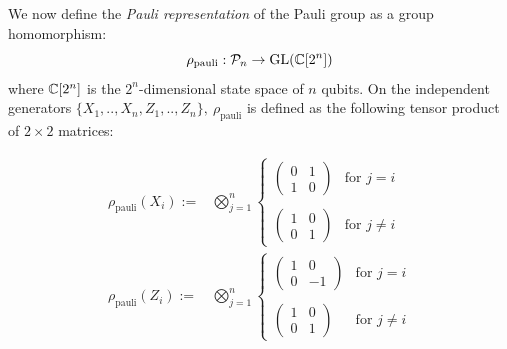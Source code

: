We now define the
{\it Pauli representation} 
of the Pauli group as a group homomorphism:
$$
    \rho_{\mathrm{pauli}} : \mathcal{P}_n \to \mathrm{GL}(\mathbb{C}[2^n])
$$
where $\mathbb{C}[2^n]$ is the $2^n$-dimensional state space of $n$ qubits.
On the independent generators 
$\{X_1, .., X_n, Z_1, .., Z_n\},\ \rho_{\mathrm{pauli}}$
is defined as the following tensor product of $2\times 2$ matrices:


\begin{align*}
\rho_{\mathrm{pauli}}(X_i) := &\bigotimes_{j=1}^n \left\{ \begin{array}{ll}
\left( \begin{array}{ll}
0&1\\
1&0\end{array} \right) &\mbox{for $j=i$}\\
\\
\left( \begin{array}{ll}
1&0\\
0&1\end{array} \right) &\mbox{for $j\ne i$} \end{array}
\right.\\
\rho_{\mathrm{pauli}}(Z_i) := &\bigotimes_{j=1}^n \left\{ \begin{array}{ll}
\left( \begin{array}{ll}
1&0\\
0&-1\end{array} \right) &\mbox{for $j=i$}\\
\\
\left( \begin{array}{rr}
1&0\\
0&1\end{array} \right) &\mbox{for $j\ne i$}\end{array}
\right.
\end{align*}

